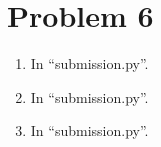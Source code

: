 \documentclass[12pt]{article}
\begin{document}
\section*{Problem 6}
\begin{enumerate}[label=(\alph*)]
  \item In ``submission.py''.
  \item In ``submission.py''.
  \item In ``submission.py''.
\end{enumerate}
\end{document}
